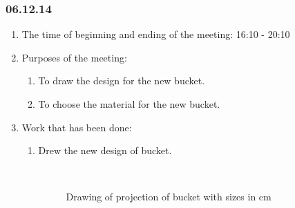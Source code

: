 \subsubsection{06.12.14}

\begin{enumerate}
	\item The time of beginning and ending of the meeting:
	16:10 - 20:10
	\item Purposes of the meeting:
	\begin{enumerate}
	  \item To draw the design for the new bucket.
	  
	  \item To choose the material for the new bucket.
	  
    \end{enumerate}
	\item Work that has been done:
	\begin{enumerate}
	  \item Drew the new design of bucket.
	  
	  \begin{figure}[H]
	  	\begin{minipage}[h]{0.2\linewidth}
	  		\center  
	  	\end{minipage}
	  	\begin{minipage}[h]{0.6\linewidth}
	  		\caption{Drawing of projection of bucket with sizes in cm}
	  	\end{minipage}
	  \end{figure}
	  

\end{enumerate}
\end{enumerate}
